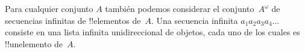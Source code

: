 \documentclass[../../../include/open-logic-section]{subfiles}
\begin{document}
\begin{ex}
Para cualquier conjunto $A$ también podemos considerar el conjunto~$A^\omega$ de secuencias infinitas de !!{elementos} de~$A$. Una secuencia infinita $a_1a_2a_3a_4\dots$ consiste en una lista infinita unidireccional de objetos, cada uno de los cuales es !!un{elemento} de~$A$.
\end{ex}
\end{document}
